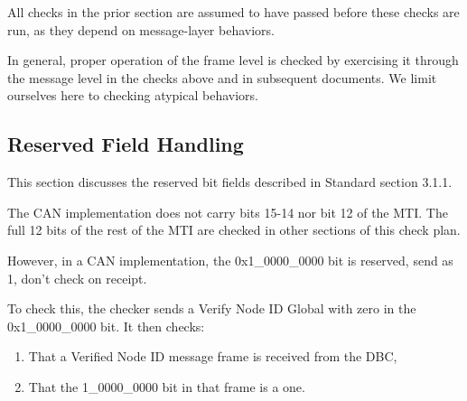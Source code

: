 All checks in the prior section are assumed to have passed before these
checks are run, as they depend on message-layer behaviors.

In general, proper operation of the frame level is checked by 
exercising it through the message level in the checks above and in subsequent 
documents.  We limit ourselves here to checking atypical behaviors.

\subsection{Reserved Field Handling}

This section discusses the reserved bit fields described in Standard section 3.1.1.

The CAN implementation does not carry bits 15-14 nor bit 12 of the MTI. 
The full 12 bits of the rest of the MTI are checked in other sections of this check plan.

However, in a CAN implementation, the 0x1\_0000\_0000 bit is reserved, send as 1, 
don't check on receipt.

To check this, the checker sends a Verify Node ID Global with zero in the 0x1\_0000\_0000
bit. It then checks:

\begin{enumerate}
\item That a Verified Node ID message frame is received from the DBC,
\item That the 1\_0000\_0000 bit in that frame is a one.
\end{enumerate}



  
